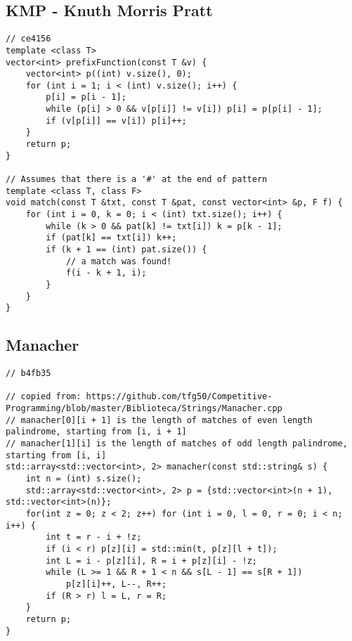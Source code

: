 \documentclass[12pt, a4paper, twoside]{article}
\begin{document}
\subsection{KMP - Knuth Morris Pratt
}
\begin{lstlisting}
// ce4156
template <class T>
vector<int> prefixFunction(const T &v) {
	vector<int> p((int) v.size(), 0);
	for (int i = 1; i < (int) v.size(); i++) {
		p[i] = p[i - 1];
		while (p[i] > 0 && v[p[i]] != v[i]) p[i] = p[p[i] - 1];
		if (v[p[i]] == v[i]) p[i]++;
	}
	return p;
}

// Assumes that there is a '#' at the end of pattern
template <class T, class F>
void match(const T &txt, const T &pat, const vector<int> &p, F f) {
	for (int i = 0, k = 0; i < (int) txt.size(); i++) {
		while (k > 0 && pat[k] != txt[i]) k = p[k - 1];
		if (pat[k] == txt[i]) k++;
		if (k + 1 == (int) pat.size()) {
			// a match was found!
			f(i - k + 1, i);
		}
	}
}
\end{lstlisting}

\subsection{Manacher
}
\begin{lstlisting}
// b4fb35

// copied from: https://github.com/tfg50/Competitive-Programming/blob/master/Biblioteca/Strings/Manacher.cpp
// manacher[0][i + 1] is the length of matches of even length palindrome, starting from [i, i + 1]
// manacher[1][i] is the length of matches of odd length palindrome, starting from [i, i]
std::array<std::vector<int>, 2> manacher(const std::string& s) {
	int n = (int) s.size();
	std::array<std::vector<int>, 2> p = {std::vector<int>(n + 1), std::vector<int>(n)};
	for(int z = 0; z < 2; z++) for (int i = 0, l = 0, r = 0; i < n; i++) {
		int t = r - i + !z;
		if (i < r) p[z][i] = std::min(t, p[z][l + t]);
		int L = i - p[z][i], R = i + p[z][i] - !z;
		while (L >= 1 && R + 1 < n && s[L - 1] == s[R + 1])
			p[z][i]++, L--, R++;
		if (R > r) l = L, r = R;
	}
	return p;
}
\end{lstlisting}
\end{document}
